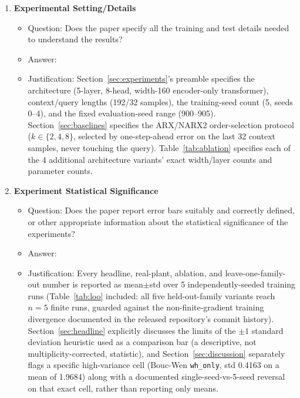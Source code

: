 \documentclass{article}
\begin{document}
\begin{enumerate}
\item {\bf Experimental Setting/Details}
  \begin{itemize}
    \item Question: Does the paper specify all the training and test details needed to understand the results?
    \item Answer: \answerYes{}
    \item Justification: Section~\ref{sec:experiments}'s preamble specifies the architecture (5-layer, 8-head, width-160 encoder-only transformer), context/query lengths (192/32 samples), the training-seed count (5, seeds 0--4), and the fixed evaluation-seed range (900--905). Section~\ref{sec:baselines} specifies the ARX/NARX2 order-selection protocol ($k\in\{2,4,8\}$, selected by one-step-ahead error on the last 32 context samples, never touching the query). Table~\ref{tab:ablation} specifies each of the 4 additional architecture variants' exact width/layer counts and parameter counts.
  \end{itemize}

\item {\bf Experiment Statistical Significance}
  \begin{itemize}
    \item Question: Does the paper report error bars suitably and correctly defined, or other appropriate information about the statistical significance of the experiments?
    \item Answer: \answerYes{}
    \item Justification: Every headline, real-plant, ablation, and leave-one-family-out number is reported as mean$\pm$std over 5 independently-seeded training runs (Table~\ref{tab:loo} included: all five held-out-family variants reach $n=5$ finite runs, guarded against the non-finite-gradient training divergence documented in the released repository's commit history). Section~\ref{sec:headline} explicitly discusses the limits of the $\pm1$ standard deviation heuristic used as a comparison bar (a descriptive, not multiplicity-corrected, statistic), and Section~\ref{sec:discussion} separately flags a specific high-variance cell (Bouc-Wen \texttt{wh\_only}, std 0.4163 on a mean of 1.9684) along with a documented single-seed-vs-5-seed reversal on that exact cell, rather than reporting only means.
  \end{itemize}


\end{enumerate}
\end{document}
